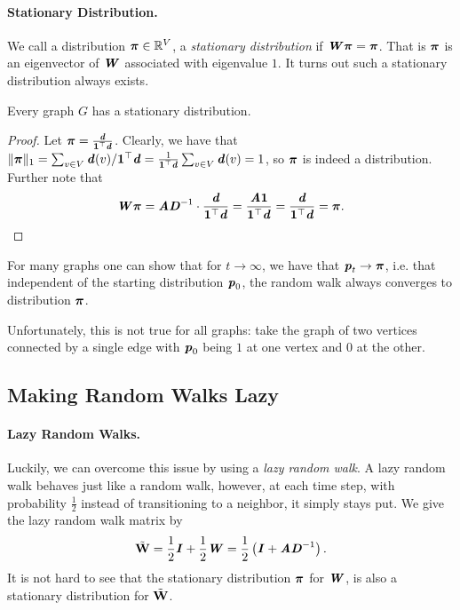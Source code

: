 \paragraph{Stationary Distribution.} We call a distribution $\boldsymbol{\pi} \in \mathbb{R}^V$, a \emph{stationary distribution} if $\boldsymbol{\mathit{W}}\boldsymbol{\pi} = \boldsymbol{\pi}$. That is $\boldsymbol{\pi}$ is an eigenvector of $\boldsymbol{\mathit{W}}$ associated with eigenvalue $1$. It turns out such a stationary distribution always exists.

\begin{lemma}\label{lma:thereExistsStationaryDistr}
Every graph $G$ has a stationary distribution.
\end{lemma}
\begin{proof}
Let $\boldsymbol{\pi} = \frac{\boldsymbol{\mathit{d}}}{\boldsymbol{1}^\top\boldsymbol{\mathit{d}}}$. Clearly, we have that $\|\boldsymbol{\pi}\|_1 = \sum_{v \in V} \boldsymbol{\mathit{d}}(v)/\boldsymbol{1}^\top\boldsymbol{\mathit{d}} = \frac{1}{\boldsymbol{1}^\top\boldsymbol{\mathit{d}}} \sum_{v \in V} \boldsymbol{\mathit{d}}(v) = 1$, so $\boldsymbol{\pi}$ is indeed a distribution. Further note that
\[
\boldsymbol{\mathit{W}} \boldsymbol{\pi} = \boldsymbol{\mathit{A}} \boldsymbol{\mathit{D}}^{-1} \cdot  \frac{\boldsymbol{\mathit{d}}}{\boldsymbol{1}^\top\boldsymbol{\mathit{d}}} = \frac{\boldsymbol{\mathit{A}} \boldsymbol{1}}{\boldsymbol{1}^\top \boldsymbol{\mathit{d}}} = \frac{\boldsymbol{\mathit{d}}}{\boldsymbol{1}^\top \boldsymbol{\mathit{d}}} = \boldsymbol{\pi}.
\]
\end{proof}

For many graphs one can show that for $t \to \infty$, we have that $\boldsymbol{\mathit{p}}_t \to \boldsymbol{\pi}$, i.e. that independent of the starting distribution $\boldsymbol{\mathit{p}}_0$, the random walk always converges to distribution $\boldsymbol{\pi}$. 

Unfortunately, this is not true for all graphs: take the graph of two vertices connected by a single edge with $\boldsymbol{\mathit{p}}_0$ being $1$ at one vertex and $0$ at the other. 

\subsection{Making Random Walks Lazy}

\paragraph{Lazy Random Walks.} Luckily, we can overcome this issue by using a \emph{lazy random walk}. A lazy random walk behaves just like a random walk, however, at each time step, with probability $\frac{1}{2}$ instead of transitioning to a neighbor, it simply stays put. We give the lazy random walk matrix by
\[
 {\tilde{\mathbf{W}}} = \frac{1}{2}\boldsymbol{\mathit{I}} + \frac{1}{2} \boldsymbol{\mathit{W}} = \frac{1}{2}\left(\boldsymbol{\mathit{I}} + \boldsymbol{\mathit{A}} \boldsymbol{\mathit{D}}^{-1}\right).
\]
It is not hard to see that the stationary distribution $\boldsymbol{\pi}$ for $\boldsymbol{\mathit{W}}$, is also a stationary distribution for ${\tilde{\mathbf{W}}}$.

